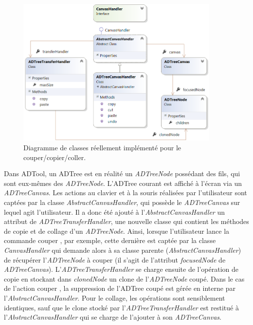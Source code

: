         \begin{figure}[H]
            \centering
                \includegraphics[width=0.9\textwidth]{figure/copiercollerReel.png}
            \caption{Diagramme de classes réellement implémenté pour le couper/copier/coller.}
            \label{fig:copypasteReel}
        \end{figure}

        Dans ADTool, un ADTree est en réalité un \emph{ADTreeNode} possédant des fils, qui sont eux-mêmes des \emph{ADTreeNode}. L'ADTree courant est affiché à l'écran via un \emph{ADTreeCanvas}. Les actions au clavier et à la souris réalisées par l'utilisateur sont captées par la classe \emph{AbstractCanvasHandler}, qui possède le \emph{ADTreeCanvas} sur lequel agit l'utilisateur. Il a donc été ajouté à l'\emph{AbstractCanvasHandler} un attribut de \emph{ADTreeTransferHandler}, une nouvelle classe qui contient les méthodes de copie et de collage d'un \emph{ADTreeNode}. Ainsi, lorsque l'utilisateur lance la commande \og couper \fg{}, par exemple, cette dernière est captée par la classe \emph{CanvasHandler} qui demande alors à sa classe parente (\emph{AbstractCanvasHandler}) de récupérer l'\emph{ADTreeNode} à couper (il s'agit de l'attribut \emph{focusedNode} de \emph{ADTreeCanvas}). L'\emph{ADTreeTransferHandler} se charge ensuite de l'opération de copie en stockant dans \emph{clonedNode} un clone de l'\emph{ADTreeNode} coupé. Dans le cas de l'action \og couper \fg{}, la suppression de l'ADTree coupé est gérée en interne par l'\emph{AbstractCanvasHandler}. Pour le collage, les opérations sont sensiblement identiques, sauf que le clone stocké par l'\emph{ADTreeTransferHandler} est restitué à l'\emph{AbstractCanvasHandler} qui se charge de l'ajouter à son \emph{ADTreeCanvas}.
       
